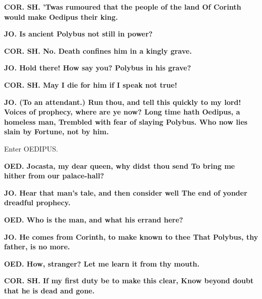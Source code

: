 \documentclass[11pt,letter]{book}
\begin{document}
\par \textbf{COR. SH. ’Twas rumoured that the people of the land Of Corinth would make Oedipus their king.}
\par 

\par \textbf{JO. Is ancient Polybus not still in power?}
\par 

\par \textbf{COR. SH. No. Death confines him in a kingly grave.}
\par 

\par \textbf{JO. Hold there! How say you? Polybus in his grave?}
\par 

\par \textbf{COR. SH. May I die for him if I speak not true!}
\par 

\par \textbf{JO. (To an attendant.) Run thou, and tell this quickly to my lord! Voices of prophecy, where are ye now? Long time hath Oedipus, a homeless man, Trembled with fear of slaying Polybus. Who now lies slain by Fortune, not by him.}
\par 

\par  Enter OEDIPUS.

\par \textbf{OED. Jocasta, my dear queen, why didst thou send To bring me hither from our palace-hall?}
\par 

\par \textbf{JO. Hear that man’s tale, and then consider well The end of yonder dreadful prophecy.}
\par 

\par \textbf{OED. Who is the man, and what his errand here?}
\par 

\par \textbf{JO. He comes from Corinth, to make known to thee That Polybus, thy father, is no more.}
\par 

\par \textbf{OED. How, stranger? Let me learn it from thy mouth.}
\par 

\par \textbf{COR. SH. If my first duty be to make this clear, Know beyond doubt that he is dead and gone.}
\par 
\end{document}
